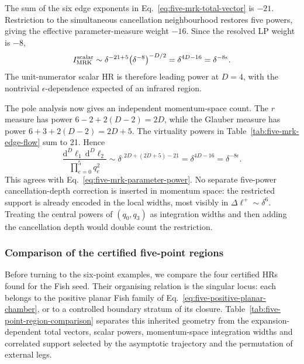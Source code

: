 \documentclass[a4paper,11pt]{article}
\newcommand{\dd}{\mathrm d}
\begin{document}
The sum of the six edge exponents in
Eq.~\eqref{eq:five-mrk-total-vector} is \(-21\).  Restriction to the
simultaneous cancellation neighbourhood restores five powers, giving the
effective parameter-measure weight \(-16\).  Since the resolved LP weight is
\(-8\),
\begin{equation}
 I_{\rm MRK}^{\rm scalar}\sim
 \delta^{-21+5}\bigl(\delta^{-8}\bigr)^{-D/2}
 =\delta^{4D-16}=\delta^{-8\epsilon}.
 \label{eq:five-mrk-parameter-power}
\end{equation}
The unit-numerator scalar HR is therefore leading power at \(D=4\), with the
nontrivial \(\epsilon\)-dependence expected of an infrared region.

The pole analysis now gives an independent momentum-space count.  The
\(r\) measure has power
\(6-2+2(D-2)=2D\), while the Glauber measure has power
\(6+3+2(D-2)=2D+5\).  The virtuality powers in
Table~\ref{tab:five-mrk-edge-flow} sum to 21.  Hence
\begin{equation}
 \frac{\dd^D\ell_1\,\dd^D\ell_2}
      {\prod_{e=0}^{5}q_e^2}
 \sim\delta^{,2D+(2D+5)-21}
 =\delta^{4D-16}=\delta^{-8\epsilon}.
 \label{eq:five-mrk-momentum-power}
\end{equation}
This agrees with Eq.~\eqref{eq:five-mrk-parameter-power}.  No separate
five-power cancellation-depth correction is inserted in momentum space: the
restricted support is already encoded in the local widths, most visibly in
\(\Delta\ell^+\sim\delta^6\).  Treating the central powers of \((q_0,q_3)\)
as integration widths and then adding the cancellation depth would double
count the restriction.

\fi
\subsubsection{Comparison of the certified five-point regions}

Before turning to the six-point examples, we compare the four certified HRs
found for the Fish seed.  Their organising relation is the singular locus:
each belongs to the positive planar Fish family of
Eq.~\eqref{eq:five-positive-planar-chamber}, or to a controlled boundary
stratum of its closure.  Table~\ref{tab:five-point-region-comparison}
separates this inherited geometry from the expansion-dependent total vectors,
scalar powers, momentum-space integration widths and correlated support
selected by the asymptotic trajectory and the permutation of external legs.
\end{document}

